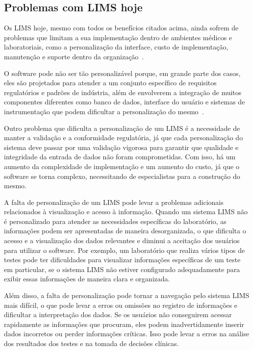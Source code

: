 \subsection{Problemas com LIMS hoje}


Os LIMS hoje, mesmo com todos os benefícios citados acima, ainda sofrem de problemas que limitam a sua implementação dentro de ambientes médicos e laboratoriais, como a personalização da interface, custo de implementação, manutenção e suporte dentro da organização~\cite{Avery2000ProductGuide., 2018CommonAstrix}.

O software pode não ser tão personalizável porque, em grande parte dos casos, eles são projetados para atender a um conjunto específico de requisitos regulatórios e padrões de indústria, além de envolverem a integração de muitos componentes diferentes como banco de dados, interface do usuário e sistemas de instrumentação que podem dificultar a personalização do mesmo~\cite{Tomlinson2022AOperations}.

Outro problema que dificulta a personalização de um LIMS é a necessidade de manter a validação e a conformidade regulatória, já que cada personalização do sistema deve passar por uma validação vigorosa para garantir que qualidade e integridade da entrada de dados não foram comprometidas.
Com isso, há um aumento da complexidade de implementação e um aumento do custo, já que o software se torna complexo, necessitando de especialistas para a construção do mesmo.



A falta de personalização de um LIMS pode levar a problemas adicionais relacionados à visualização e acesso à informação. Quando um sistema LIMS não é personalizado para atender as necessidades específicas do laboratório, as informações podem ser apresentadas de maneira desorganizada, o que dificulta o acesso e a visualização dos dados relevantes e diminui a aceitação dos usuários para utilizar o software. Por exemplo, um laboratório que realiza vários tipos de testes pode ter dificuldades para visualizar informações específicas de um teste em particular, se o sistema LIMS não estiver configurado adequadamente para exibir essas informações de maneira clara e organizada.


Além disso, a falta de personalização pode tornar a navegação pelo sistema LIMS mais difícil, o que pode levar a erros ou omissões no registro de informações e dificultar a interpretação dos dados. Se os usuários não conseguirem acessar rapidamente as informações que procuram, eles podem inadvertidamente inserir dados incorretos ou perder informações críticas. Isso pode levar a erros na análise dos resultados dos testes e na tomada de decisões clínicas.

